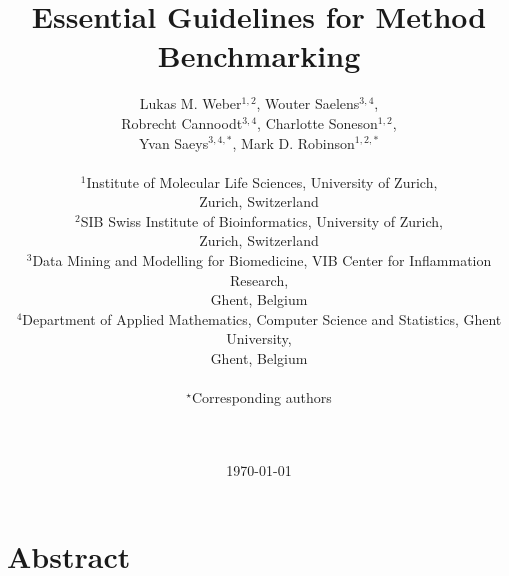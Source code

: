 \documentclass[12pt, a4paper]{article}
\begin{document}

\title{\Large{\textbf{
Essential Guidelines for Method Benchmarking
}}{\vskip 0.75cm}}

\author{
Lukas M. Weber$^{1,2}$,
Wouter Saelens$^{3,4}$,\\
Robrecht Cannoodt$^{3,4}$,
Charlotte Soneson$^{1,2}$,\\
Yvan Saeys$^{3,4,*}$,
Mark D. Robinson$^{1,2,*}$\\ \\
\normalsize{$^1$Institute of Molecular Life Sciences, University of Zurich, }\\
\normalsize{Zurich, Switzerland}\\
\normalsize{$^2$SIB Swiss Institute of Bioinformatics, University of Zurich, }\\
\normalsize{Zurich, Switzerland}\\
\normalsize{$^3$Data Mining and Modelling for Biomedicine, VIB Center for Inflammation Research, }\\
\normalsize{Ghent, Belgium}\\
\normalsize{$^4$Department of Applied Mathematics, Computer Science and Statistics, Ghent University, }\\
\normalsize{Ghent, Belgium}\\ \\
\normalsize{$^\star$Corresponding authors}\\ \\ \\
}

\date{\today}



\begin{titlepage}

\maketitle

\thispagestyle{empty}

\end{titlepage}




\section*{Abstract}
\end{document}
